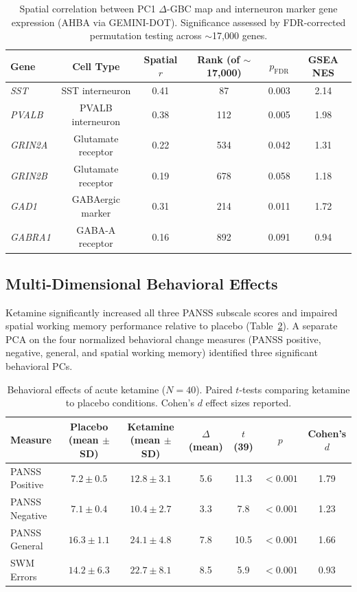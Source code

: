\documentclass[11pt]{article}
\begin{document}
\begin{table}[H]
\centering
\caption{Spatial correlation between PC1 $\Delta$-GBC map and interneuron marker gene expression (AHBA via GEMINI-DOT). Significance assessed by FDR-corrected permutation testing across $\sim$17,000 genes.}
\label{tab:gene_expression}
\begin{tabular}{lccccc}
\toprule
\textbf{Gene} & \textbf{Cell Type} & \textbf{Spatial $r$} & \textbf{Rank (of $\sim$17,000)} & \textbf{$p_{\mathrm{FDR}}$} & \textbf{GSEA NES} \\
\midrule
\textit{SST} & SST interneuron & 0.41 & 87 & 0.003 & 2.14 \\
\textit{PVALB} & PVALB interneuron & 0.38 & 112 & 0.005 & 1.98 \\
\textit{GRIN2A} & Glutamate receptor & 0.22 & 534 & 0.042 & 1.31 \\
\textit{GRIN2B} & Glutamate receptor & 0.19 & 678 & 0.058 & 1.18 \\
\textit{GAD1} & GABAergic marker & 0.31 & 214 & 0.011 & 1.72 \\
\textit{GABRA1} & GABA-A receptor & 0.16 & 892 & 0.091 & 0.94 \\
\bottomrule
\end{tabular}
\end{table}

\subsection{Multi-Dimensional Behavioral Effects}

Ketamine significantly increased all three PANSS subscale scores and impaired spatial working memory performance relative to placebo (Table~\ref{tab:behavioral_effects}). A separate PCA on the four normalized behavioral change measures (PANSS positive, negative, general, and spatial working memory) identified three significant behavioral PCs.

\begin{table}[H]
\centering
\caption{Behavioral effects of acute ketamine ($N = 40$). Paired $t$-tests comparing ketamine to placebo conditions. Cohen's $d$ effect sizes reported.}
\label{tab:behavioral_effects}
\begin{tabular}{lcccccc}
\toprule
\textbf{Measure} & \textbf{Placebo (mean $\pm$ SD)} & \textbf{Ketamine (mean $\pm$ SD)} & \textbf{$\Delta$ (mean)} & \textbf{$t$(39)} & \textbf{$p$} & \textbf{Cohen's $d$} \\
\midrule
PANSS Positive & $7.2 \pm 0.5$ & $12.8 \pm 3.1$ & 5.6 & 11.3 & $< 0.001$ & 1.79 \\
PANSS Negative & $7.1 \pm 0.4$ & $10.4 \pm 2.7$ & 3.3 & 7.8 & $< 0.001$ & 1.23 \\
PANSS General & $16.3 \pm 1.1$ & $24.1 \pm 4.8$ & 7.8 & 10.5 & $< 0.001$ & 1.66 \\
SWM Errors & $14.2 \pm 6.3$ & $22.7 \pm 8.1$ & 8.5 & 5.9 & $< 0.001$ & 0.93 \\
\bottomrule
\end{tabular}
\end{table}
\end{document}
